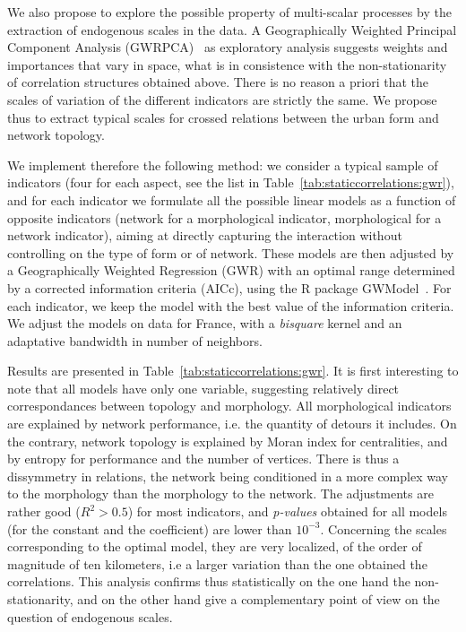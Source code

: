 \documentclass[11pt]{article}
\begin{document}
We also propose to explore the possible property of multi-scalar processes by the extraction of endogenous scales in the data. A Geographically Weighted Principal Component Analysis (GWRPCA)~\cite{harris2011geographically} as exploratory analysis suggests weights and importances that vary in space, what is in consistence with the non-stationarity of correlation structures obtained above. There is no reason a priori that the scales of variation of the different indicators are strictly the same. We propose thus to extract typical scales for crossed relations between the urban form and network topology.

We implement therefore the following method: we consider a typical sample of indicators (four for each aspect, see the list in Table~\ref{tab:staticcorrelations:gwr}), and for each indicator we formulate all the possible linear models as a function of opposite indicators (network for a morphological indicator, morphological for a network indicator), aiming at directly capturing the interaction without controlling on the type of form or of network. These models are then adjusted by a Geographically Weighted Regression (GWR) with an optimal range determined by a corrected information criteria (AICc), using the R package GWModel~\citep{gollini2013gwmodel}. For each indicator, we keep the model with the best value of the information criteria. We adjust the models on data for France, with a \emph{bisquare} kernel and an adaptative bandwidth in number of neighbors.


Results are presented in Table~\ref{tab:staticcorrelations:gwr}. It is first interesting to note that all models have only one variable, suggesting relatively direct correspondances between topology and morphology. All morphological indicators are explained by network performance, i.e. the quantity of detours it includes. On the contrary, network topology is explained by Moran index for centralities, and by entropy for performance and the number of vertices. There is thus a dissymmetry in relations, the network being conditioned in a more complex way to the morphology than the morphology to the network. The adjustments are rather good ($R^2 > 0.5$) for most indicators, and \emph{p-values} obtained for all models (for the constant and the coefficient) are lower than $10^{-3}$. Concerning the scales corresponding to the optimal model, they are very localized, of the order of magnitude of ten kilometers, i.e a larger variation than the one obtained the correlations. This analysis confirms thus statistically on the one hand the non-stationarity, and on the other hand give a complementary point of view on the question of endogenous scales.
\end{document}
